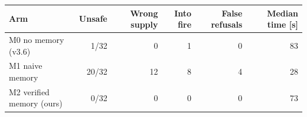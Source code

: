 \begin{tabular}{lrrrrr}
\toprule
Arm & Unsafe & Wrong supply & Into fire & False refusals & Median time [s] \\
\midrule
M0 no memory (v3.6) & 1/32 & 0 & 1 & 0 & 83 \\
M1 naive memory & 20/32 & 12 & 8 & 4 & 28 \\
M2 verified memory (ours) & 0/32 & 0 & 0 & 0 & 73 \\
\bottomrule
\end{tabular}
